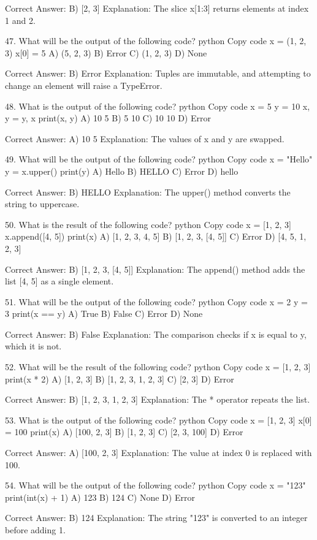 Correct Answer: B) [2, 3]
Explanation: The slice x[1:3] returns elements at index 1 and 2.

47. What will be the output of the following code?
python
Copy code
x = (1, 2, 3)
x[0] = 5
A) (5, 2, 3)
B) Error
C) (1, 2, 3)
D) None

Correct Answer: B) Error
Explanation: Tuples are immutable, and attempting to change an element will raise a TypeError.

48. What is the output of the following code?
python
Copy code
x = 5
y = 10
x, y = y, x
print(x, y)
A) 10 5
B) 5 10
C) 10 10
D) Error

Correct Answer: A) 10 5
Explanation: The values of x and y are swapped.

49. What will be the output of the following code?
python
Copy code
x = "Hello"
y = x.upper()
print(y)
A) Hello
B) HELLO
C) Error
D) hello

Correct Answer: B) HELLO
Explanation: The upper() method converts the string to uppercase.

50. What is the result of the following code?
python
Copy code
x = [1, 2, 3]
x.append([4, 5])
print(x)
A) [1, 2, 3, 4, 5]
B) [1, 2, 3, [4, 5]]
C) Error
D) [4, 5, 1, 2, 3]

Correct Answer: B) [1, 2, 3, [4, 5]]
Explanation: The append() method adds the list [4, 5] as a single element.

51. What will be the output of the following code?
python
Copy code
x = 2
y = 3
print(x == y)
A) True
B) False
C) Error
D) None

Correct Answer: B) False
Explanation: The comparison checks if x is equal to y, which it is not.

52. What will be the result of the following code?
python
Copy code
x = [1, 2, 3]
print(x * 2)
A) [1, 2, 3]
B) [1, 2, 3, 1, 2, 3]
C) [2, 3]
D) Error

Correct Answer: B) [1, 2, 3, 1, 2, 3]
Explanation: The * operator repeats the list.

53. What is the output of the following code?
python
Copy code
x = [1, 2, 3]
x[0] = 100
print(x)
A) [100, 2, 3]
B) [1, 2, 3]
C) [2, 3, 100]
D) Error

Correct Answer: A) [100, 2, 3]
Explanation: The value at index 0 is replaced with 100.

54. What will be the output of the following code?
python
Copy code
x = "123"
print(int(x) + 1)
A) 123
B) 124
C) None
D) Error

Correct Answer: B) 124
Explanation: The string "123" is converted to an integer before adding 1.

